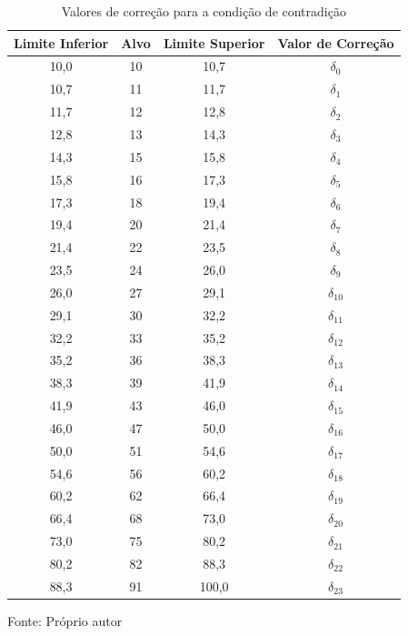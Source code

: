 \begin{table}[h]
\centering
\caption{Valores de correção para a condição de contradição}
\label{tab:correcaoDelta}

\begin{tabular}{c|c|c||c}
\hline
Limite Inferior & Alvo & Limite Superior & Valor de Correção\\ \hline
\hline
10,0 & 10 & 10,7 & $\delta_0$ \\ \hline
10,7 & 11 & 11,7 & $\delta_1$ \\ \hline
11,7 & 12 & 12,8 & $\delta_2$ \\ \hline
12,8 & 13 & 14,3 & $\delta_3$ \\ \hline
14,3 & 15 & 15,8 & $\delta_4$ \\ \hline
15,8 & 16 & 17,3 & $\delta_5$ \\ \hline
17,3 & 18 & 19,4 & $\delta_6$ \\ \hline
19,4 & 20 & 21,4 & $\delta_7$ \\ \hline
21,4 & 22 & 23,5 & $\delta_8$ \\ \hline
23,5 & 24 & 26,0 & $\delta_9$ \\ \hline
26,0 & 27 & 29,1 & $\delta_{10}$ \\ \hline
29,1 & 30 & 32,2 & $\delta_{11}$ \\ \hline
32,2 & 33 & 35,2 & $\delta_{12}$ \\ \hline
35,2 & 36 & 38,3 & $\delta_{13}$ \\ \hline
38,3 & 39 & 41,9 & $\delta_{14}$ \\ \hline
41,9 & 43 & 46,0 & $\delta_{15}$ \\ \hline
46,0 & 47 & 50,0 & $\delta_{16}$ \\ \hline
50,0 & 51 & 54,6 & $\delta_{17}$ \\ \hline
54,6 & 56 & 60,2 & $\delta_{18}$ \\ \hline
60,2 & 62 & 66,4 & $\delta_{19}$ \\ \hline
66,4 & 68 & 73,0 & $\delta_{20}$ \\ \hline
73,0 & 75 & 80,2 & $\delta_{21}$ \\ \hline
80,2 & 82 & 88,3 & $\delta_{22}$ \\ \hline
88,3 & 91 &100,0 & $\delta_{23}$ \\ \hline

\end{tabular}

{\vspace{0.2cm} \small Fonte: Próprio autor}
\end{table}


